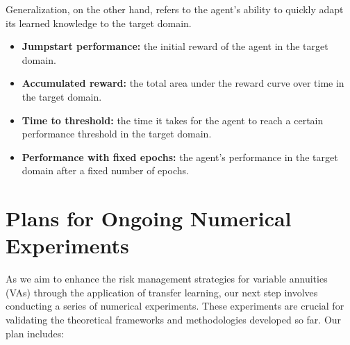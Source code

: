 Generalization, on the other hand, refers to the agent's ability to quickly adapt its learned knowledge to the target domain.

\begin{itemize}
    \item \textbf{Jumpstart performance:} the initial reward of the agent in the target domain.
    \item \textbf{Accumulated reward:} the total area under the reward curve over time in the target domain.
    \item \textbf{Time to threshold:} the time it takes for the agent to reach a certain performance threshold in the target domain.
    \item \textbf{Performance with fixed epochs:} the agent's performance in the target domain after a fixed number of epochs.
\end{itemize}

\section{Plans for Ongoing Numerical Experiments} \label{sec3:numerical}

As we aim to enhance the risk management strategies for variable annuities (VAs) through the application of transfer learning, our next step involves conducting a series of numerical experiments. These experiments are crucial for validating the theoretical frameworks and methodologies developed so far. Our plan includes:


